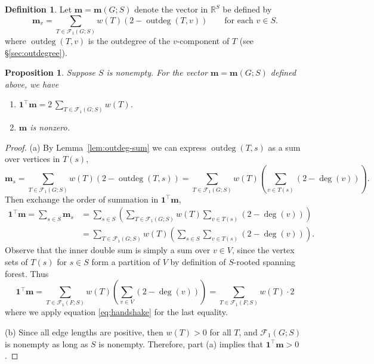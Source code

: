 \documentclass[12pt]{amsart}
\newtheorem{prop}[thm]{Proposition}
\theoremstyle{definition}
\newtheorem{dfn}[thm]{Definition}
\newcommand{\RR}{\mathbb{R}}
\newcommand{\bone}{\mathbf{1}}
\newcommand{\boldm}{\mathbf{m}}
\newcommand{\tr}{\intercal}
\newcommand{\trees}{\mathcal{F}_1}
\DeclareMathOperator{\outdeg}{outdeg}
\begin{document}
\begin{dfn}
\label{dfn:m-vector}
Let $\boldm = \boldm(G;S)$ denote the vector in $\RR^S$ be defined by
\begin{equation}
\label{eq:m-vector}
\boldm_v =  \sum_{T \in \trees(G;S)} w({T}) (2 - \outdeg(T,v))
\qquad\text{for each }v \in S.
\end{equation}
where $\outdeg(T,v)$ is the outdegree of the $v$-component of $T$ (see \S\ref{sec:outdegree}).
\end{dfn}

\begin{prop}
\label{prop:m-sum}
Suppose $S$ is nonempty.
For the vector $\boldm = \boldm(G; S)$ defined above, we have
\begin{enumerate}[label=(\alph*)]
\item 
$\displaystyle \bone^\tr \boldm = 2 \,\sum_{T \in \trees(G;S)} w({T})$.

\item 
$\boldm$ is nonzero.
\end{enumerate}
\end{prop}
\begin{proof}
(a)
By Lemma~\ref{lem:outdeg-sum} we can express $\outdeg(T, s)$ as a sum over vertices in $T(s)$,
\[
	\boldm_s = \sum_{T \in \trees(G;S)} w({T}) (2 - \outdeg (T,s))
= \sum_{T \in \trees(G;S)} w({T}) \left( \sum_{v \in T(s)}(2 - \deg(v))\right).
\]
Then exchange the order of summation in $\bone^\tr \boldm$,
\begin{align}
	\bone^\tr \boldm = \sum_{s\in S} \boldm_s &= \sum_{s \in S} \left( \sum_{T \in \trees(G;S)} w({T}) \sum_{v \in T(s)}(2 - \deg(v)) \right) \\
	&= \sum_{T \in \trees(G;S)} w({T}) \left( \sum_{s\in S} \sum_{v \in T(s)} (2 - \deg(v)) \right) .
\end{align}
Observe that the inner double sum is simply a sum over $v \in V$,
since the vertex sets of $T(s)$ for $s \in S$ form a partition of $V$ by definition of $S$-rooted spanning forest.
Thus 
\[
	\bone^\tr \boldm = \sum_{T \in \trees(F;S)} w({T}) \left( \sum_{v \in V} (2 - \deg(v))\right)
	= \sum_{T \in \trees(F;S)} w({T}) \cdot 2 
\]
where we apply equation \eqref{eq:handshake} for the last equality.

(b) 
Since all edge lengths are positive, then $w({T}) > 0$ for all $T$, and $\trees(G; S)$ is nonempty as long as $S$ is nonempty. 
Therefore, part (a) implies that $\bone^\tr \boldm > 0$.
\end{proof}
\end{document}
